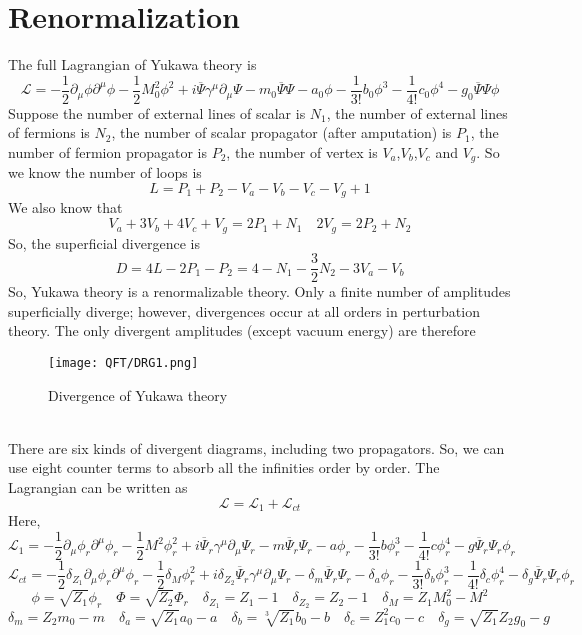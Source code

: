 \section{Renormalization}
\noindent
The full Lagrangian of Yukawa theory is
\[\mathcal{L} = -\frac{1}{2}\partial_{\mu} \phi \partial^{\mu} \phi -\frac{1}{2}M_0^2 \phi^2 + i\overline{\Psi} \gamma^{\mu} \partial_{\mu} \Psi - m_0\overline{\Psi}\Psi - a_0\phi -\frac{1}{3!}b_0\phi^3 -\frac{1}{4!}c_0 \phi^4 -g_0 \overline{\Psi}\Psi\phi\]
Suppose the number of external lines of scalar is $N_1$, the number of external lines of fermions is $N_2$, the number of scalar propagator (after amputation) is $P_1$, the number of fermion propagator is $P_2$, the number of vertex is $V_a$,$V_b$,$V_c$ and $V_g$. So we know the number of loops is
\[L = P_1+P_2-V_a -V_b-V_c-V_g+1\]
We also know that
\[V_a + 3V_b + 4V_c + V_g = 2P_1 + N_1  \quad 2V_g = 2P_2 + N_2\]
So, the superficial divergence is 
\[D = 4L - 2P_1 - P_2 = 4 -N_1 - \frac{3}{2}N_2 - 3V_a - V_b\]
So, Yukawa theory is a renormalizable theory. Only a finite number of amplitudes superficially diverge; however, divergences occur at all orders in perturbation theory. The only divergent amplitudes (except vacuum energy) are therefore
\begin{figure}[!h]
\centering
\texttt{[image: QFT/DRG1.png]}
\caption{Divergence of Yukawa theory}
\end{figure}\\
There are six kinds of divergent diagrams, including two propagators. So, we can use eight counter terms to absorb all the infinities order by order. The Lagrangian can be written as
\[\mathcal{L} = \mathcal{L}_1 + \mathcal{L}_{ct}\]
Here,
\[\mathcal{L}_1 = -\frac{1}{2}\partial_{\mu} \phi_r \partial^{\mu} \phi_r -\frac{1}{2}M^2 \phi_r^2 + i\overline{\Psi}_r \gamma^{\mu} \partial_{\mu} \Psi_r - m \overline{\Psi}_r \Psi_r - a\phi_r- \frac{1}{3!}b\phi_r^3 -\frac{1}{4!}c \phi_r^4 -g \overline{\Psi}_r\Psi_r\phi_r \]
\[\mathcal{L}_{ct} = -\frac{1}{2}\delta_{Z_1}\partial_{\mu} \phi_r \partial^{\mu} \phi_r -\frac{1}{2}\delta_M \phi_r^2 + i\delta_{Z_2}\overline{\Psi}_r \gamma^{\mu} \partial_{\mu} \Psi_r - \delta_m \overline{\Psi}_r \Psi_r - \delta_a\phi_r- \frac{1}{3!}\delta_b\phi_r^3 -\frac{1}{4!}\delta_c \phi_r^4 -\delta_g \overline{\Psi}_r\Psi_r\phi_r \]
\[\phi = \sqrt{Z_1}\phi_r \quad \Phi  = \sqrt{Z_2}\Phi_r \quad \delta_{Z_1} = Z_1 - 1 \quad \delta_{Z_2} = Z_2 - 1 \quad \delta_M = Z_1 M_0^2 - M^2\]
\[\delta_m = Z_2 m_0 - m \quad \delta_a = \sqrt{Z_1}a_0 - a \quad \delta_b = \sqrt[3]{Z_1} b_0 - b \quad \delta_c= Z_1^2 c_0 - c \quad \delta_g = \sqrt{Z_1}Z_2 g_0 - g\]

